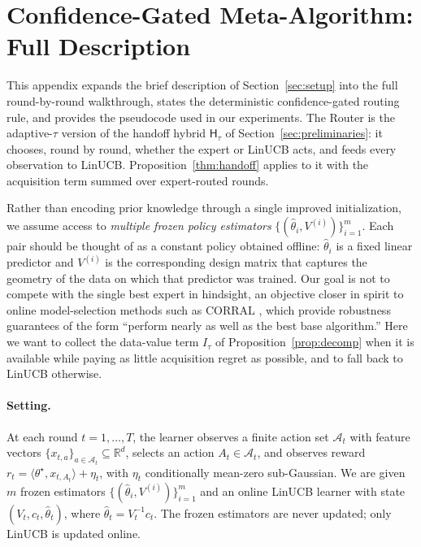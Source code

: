 \documentclass[anon]{alt2027} %
\newcommand{\Hyb}{\mathsf{H}}
\begin{document}
\section{Confidence-Gated Meta-Algorithm: Full Description}
\label{app:meta-algorithm}

This appendix expands the brief description of
Section~\ref{sec:setup} into the full round-by-round walkthrough,
states the deterministic confidence-gated routing rule, and provides
the pseudocode used in our experiments. The Router is the adaptive-$\tau$ version of the handoff hybrid
$\Hyb_\tau$ of Section~\ref{sec:preliminaries}: it chooses, round by round,
whether the expert or LinUCB acts, and feeds every observation to LinUCB.
Proposition~\ref{thm:handoff} applies to it with the acquisition term summed over
expert-routed rounds.

Rather than encoding prior knowledge through a single improved
initialization, we assume access to \emph{multiple frozen policy
estimators} $\{(\widehat\theta_i,V^{(i)})\}_{i=1}^m$. Each pair should
be thought of as a constant policy obtained offline:
$\widehat\theta_i$ is a fixed linear predictor and $V^{(i)}$ is the
corresponding design matrix that captures the geometry of the data on
which that predictor was trained. Our goal is not to compete with the
single best expert in hindsight, an objective closer in spirit to
online model-selection methods such as CORRAL
\citep{agarwal2017corralling,chen2024llmdecision}, which provide
robustness guarantees of the form ``perform nearly as well as the best
base algorithm.'' Here we want to collect the data-value term $I_\tau$ of
Proposition~\ref{prop:decomp} when it is available while paying as little
acquisition regret as possible, and to fall back to LinUCB otherwise.

\paragraph{Setting.}
At each round $t=1,\dots,T$, the learner observes a finite action set
$\mathcal A_t$ with feature vectors
$\{x_{t,a}\}_{a\in\mathcal A_t}\subseteq\mathbb R^d$, selects an action
$A_t\in\mathcal A_t$, and observes reward
$r_t = \langle\theta^\star,x_{t,A_t}\rangle + \eta_t$,
with $\eta_t$ conditionally mean-zero sub-Gaussian.
We are given $m$ frozen estimators
$\{(\widehat\theta_i,V^{(i)})\}_{i=1}^m$ and an online LinUCB learner
with state $(V_t,c_t,\widehat\theta_t)$, where
$\widehat\theta_t = V_t^{-1}c_t$. The frozen estimators are never
updated; only LinUCB is updated online.
\end{document}

